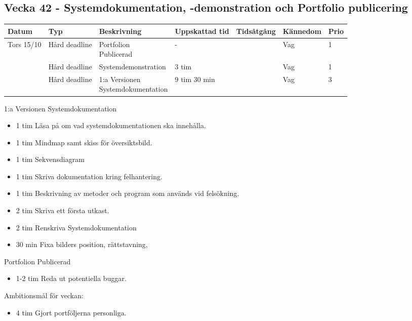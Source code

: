 \documentclass{TDP003mall}
\begin{document}
\subsection*{Vecka 42 - Systemdokumentation, -demonstration och Portfolio publicering}
\begin{tabularx}{\linewidth}{|l|l|X|l|l|l|l|}
	\hline
	Datum & Typ & Beskrivning & Uppskattad tid & Tidsåtgång  & Kännedom & Prio \\ [0.5ex]
	\hline                                             
        Tors 15/10 & Hård deadline & \makecell[tl]{Portfolion    \\ Publicerad} & - & & Vag & 1 \\\hline                                             
                   & Hård deadline & Systemdemonstration  & 3 tim &  & Vag  & 1 \\
	\hline                                             
                   & Hård deadline & \makecell[tl]{1:a Versionen \\ Systemdokumentation} & 9 tim 30 min & & Vag & 3 \\
	\hline
\end{tabularx}

1:a Versionen Systemdokumentation
\begin{itemize}
  \item 1 tim Läsa på om vad systemdokumentationen ska innehålla.
  \item 1 tim Mindmap samt skiss för översiktsbild.
  \item 1 tim Sekvensdiagram
  \item 1 tim Skriva dokumentation kring felhantering.
  \item 1 tim Beskrivning av metoder och program som används vid felsökning.
  \item 2 tim Skriva ett första utkast.
  \item 2 tim Renskriva Systemdokumentation
  \item 30 min Fixa bilders position, rättstavning, 
\end{itemize}

Portfolion Publicerad
\begin{itemize}
\item 1-2 tim Reda ut potentiella buggar.
  \end{itemize}

Ambitionsmål för veckan:
\begin{itemize}
\item 4 tim Gjort portföljerna personliga.
\end{itemize}
\end{document}
